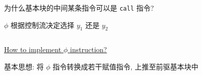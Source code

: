 \begin{frame}{}
	\begin{center}
	\end{center}
\end{frame}

\begin{frame}{}
	\begin{center}

		\vspace{0.50cm}
		为什么基本块的中间某条指令可以是 \texttt{call} 指令?

		\pause
		\vspace{0.50cm}
	\end{center}
\end{frame}


\begin{frame}{}
\end{frame}

\begin{frame}{}
	\begin{center}
		$\phi$ 根据控制流决定选择 $y_{1}$ 还是 $y_{2}$
	\end{center}
	\begin{columns}
	\end{columns}

	\pause
	\vspace{0.30cm}
	\begin{center}
		\href{https://mapping-high-level-constructs-to-llvm-ir.readthedocs.io/en/latest/control-structures/ssa-phi.html}{How to implement $\phi$ instruction?}

		\pause
		\vspace{0.30cm}
		基本思想: 将 $\phi$ 指令转换成若干赋值指令, 上推至前驱基本块中
	\end{center}
\end{frame}

